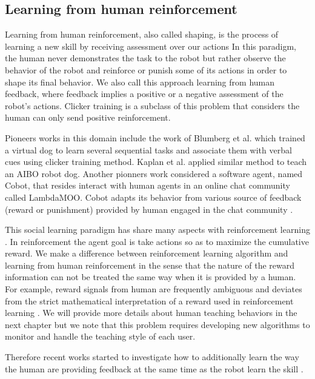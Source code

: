 \subsection{Learning from human reinforcement}

Learning from human reinforcement, also called shaping, is the process of learning a new skill by receiving assessment over our actions In this paradigm, the human never demonstrates the task to the robot but rather observe the behavior of the robot and reinforce or punish some of its actions in order to shape its final behavior. We also call this approach learning from human feedback, where feedback implies a positive or a negative assessment of the robot's actions. Clicker training is a subclass of this problem that considers the human can only send positive reinforcement.

Pioneers works in this domain include the work of Blumberg et al. \cite{blumberg2002integrated} which trained a virtual dog to learn several sequential tasks and associate them with verbal cues using clicker training method. Kaplan et al. \cite{kaplan2002robotic} applied similar method to teach an AIBO robot dog. Another pionners work considered a software agent, named Cobot, that resides interact with human agents in an online chat community called LambdaMOO. Cobot adapts its behavior from various source of feedback (reward or punishment) provided by human engaged in the chat community \cite{isbell2001social}.

This social learning paradigm has share many aspects with reinforcement learning \cite{sutton1998reinforcement}. In reinforcement the agent goal is take actions so as to maximize the cumulative reward. We make a difference between reinforcement learning algorithm and learning from human reinforcement in the sense that the nature of the reward information can not be treated the same way when it is provided by a human. For example, reward signals from human are frequently ambiguous and deviates from the strict mathematical interpretation of a reward used in reinforcement learning \cite{thomaz2008teachable,Cakmak2010optimality}. We will provide more details about human teaching behaviors in the next chapter but we note that this problem requires developing new algorithms to monitor and handle the teaching style of each user.

Therefore recent works started to investigate how to additionally learn the way the human are providing feedback at the same time as the robot learn the skill \cite{knox2009interactively}. 

